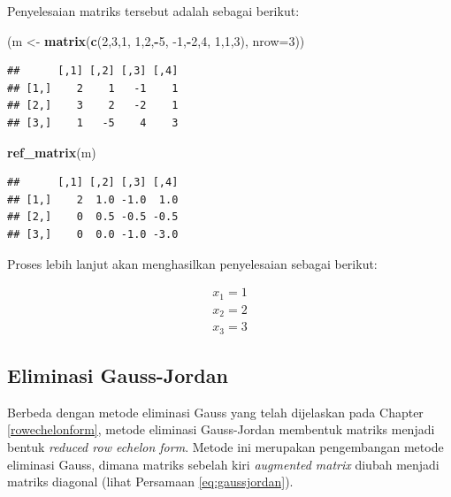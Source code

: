 \documentclass[]{book}
\newenvironment{Shaded}{\begin{snugshade}}{\end{snugshade}}
\newcommand{\DataTypeTok}[1]{\textcolor[rgb]{0.13,0.29,0.53}{#1}}
\newcommand{\DecValTok}[1]{\textcolor[rgb]{0.00,0.00,0.81}{#1}}
\newcommand{\KeywordTok}[1]{\textcolor[rgb]{0.13,0.29,0.53}{\textbf{#1}}}
\newcommand{\NormalTok}[1]{#1}
\newcommand{\OperatorTok}[1]{\textcolor[rgb]{0.81,0.36,0.00}{\textbf{#1}}}
\newcommand{\StringTok}[1]{\textcolor[rgb]{0.31,0.60,0.02}{#1}}
\theoremstyle{definition}
\theoremstyle{definition}
\theoremstyle{definition}
\theoremstyle{remark}
\begin{document}
Penyelesaian matriks tersebut adalah sebagai berikut:

\begin{Shaded}
\begin{Highlighting}[]
\NormalTok{(m <-}\StringTok{ }\KeywordTok{matrix}\NormalTok{(}\KeywordTok{c}\NormalTok{(}\DecValTok{2}\NormalTok{,}\DecValTok{3}\NormalTok{,}\DecValTok{1}\NormalTok{,}
              \DecValTok{1}\NormalTok{,}\DecValTok{2}\NormalTok{,}\OperatorTok{-}\DecValTok{5}\NormalTok{,}
              \DecValTok{-1}\NormalTok{,}\OperatorTok{-}\DecValTok{2}\NormalTok{,}\DecValTok{4}\NormalTok{,}
              \DecValTok{1}\NormalTok{,}\DecValTok{1}\NormalTok{,}\DecValTok{3}\NormalTok{), }\DataTypeTok{nrow=}\DecValTok{3}\NormalTok{))}
\end{Highlighting}
\end{Shaded}

\begin{verbatim}
##      [,1] [,2] [,3] [,4]
## [1,]    2    1   -1    1
## [2,]    3    2   -2    1
## [3,]    1   -5    4    3
\end{verbatim}

\begin{Shaded}
\begin{Highlighting}[]
\KeywordTok{ref_matrix}\NormalTok{(m)}
\end{Highlighting}
\end{Shaded}

\begin{verbatim}
##      [,1] [,2] [,3] [,4]
## [1,]    2  1.0 -1.0  1.0
## [2,]    0  0.5 -0.5 -0.5
## [3,]    0  0.0 -1.0 -3.0
\end{verbatim}

Proses lebih lanjut akan menghasilkan penyelesaian sebagai berikut:

\[
\begin{matrix}
     x_1=1     \\[0.3em]
     x_2=2     \\[0.3em]
     x_3=3
\end{matrix}
\]

\hypertarget{redrowechelonform}{%
\subsection{Eliminasi Gauss-Jordan}\label{redrowechelonform}}

Berbeda dengan metode eliminasi Gauss yang telah dijelaskan pada Chapter \ref{rowechelonform}, metode eliminasi Gauss-Jordan membentuk matriks menjadi bentuk \emph{reduced row echelon form}. Metode ini merupakan pengembangan metode eliminasi Gauss, dimana matriks sebelah kiri \emph{augmented matrix} diubah menjadi matriks diagonal (lihat Persamaan \eqref{eq:gaussjordan}).
\end{document}
